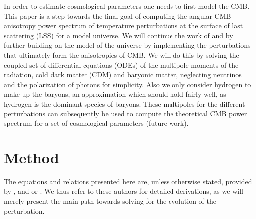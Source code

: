 \documentclass[twocolumn]{aastex62}
\begin{document}
In order to estimate cosmological parameters one needs to first model the CMB. This paper is a step towards the final goal of computing the angular CMB anisotropy power spectrum of temperature perturbations at the surface of last scattering (LSS) for a model universe. We will continue the work of \cite{stutzer:2020a} and \cite{stutzer:2020b} by further building on the model of the universe by implementing the perturbations that ultimately form the anisotropies of CMB. We will do this by solving the coupled set of differential equations (ODEs) of the multipole moments of the radiation, cold dark matter (CDM) and baryonic matter, neglecting neutrinos and the polarization of photons for simplicity. Also we only consider hydrogen to make up the baryons, an approximation which should hold fairly well, as hydrogen is the dominant species of baryons. These multipoles for the different perturbations can subsequently be used to compute the theoretical CMB power spectrum for a set of cosmological parameters (future work).

\section{Method} \label{sec:Method}
The equations and relations presented here are, unless otherwise stated, provided by \cite{callin:2006}, \cite{winther:2020b} and or \cite{dodelson:2003}. We thus refer to these authors for detailed derivations, as we will merely present the main path towards solving for the evolution of the perturbation.
\end{document}
